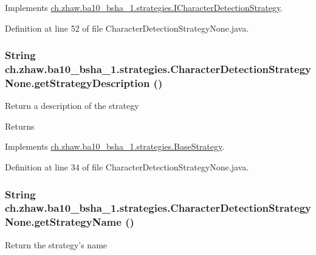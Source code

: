 Implements \hyperlink{interfacech_1_1zhaw_1_1ba10__bsha__1_1_1strategies_1_1ICharacterDetectionStrategy_a994429a274e75c471d18aca69dce2c1d}{ch.zhaw.ba10\_\-bsha\_\-1.strategies.ICharacterDetectionStrategy}.

Definition at line 52 of file CharacterDetectionStrategyNone.java.\hypertarget{classch_1_1zhaw_1_1ba10__bsha__1_1_1strategies_1_1CharacterDetectionStrategyNone_a77ffbdb8eb70ff5517bb8821a2c23572}{
\subsubsection[{getStrategyDescription}]{\setlength{\rightskip}{0pt plus 5cm}String ch.zhaw.ba10\_\-bsha\_\-1.strategies.CharacterDetectionStrategyNone.getStrategyDescription ()}}
\label{classch_1_1zhaw_1_1ba10__bsha__1_1_1strategies_1_1CharacterDetectionStrategyNone_a77ffbdb8eb70ff5517bb8821a2c23572}
Return a description of the strategy

\begin{DoxyReturn}{Returns}

\end{DoxyReturn}


Implements \hyperlink{classch_1_1zhaw_1_1ba10__bsha__1_1_1strategies_1_1BaseStrategy_a75fdb36932ad701f6375cc1fe718056b}{ch.zhaw.ba10\_\-bsha\_\-1.strategies.BaseStrategy}.

Definition at line 34 of file CharacterDetectionStrategyNone.java.\hypertarget{classch_1_1zhaw_1_1ba10__bsha__1_1_1strategies_1_1CharacterDetectionStrategyNone_a9ee9165c5f2511331b3defaa48d35b4c}{
\subsubsection[{getStrategyName}]{\setlength{\rightskip}{0pt plus 5cm}String ch.zhaw.ba10\_\-bsha\_\-1.strategies.CharacterDetectionStrategyNone.getStrategyName ()}}
\label{classch_1_1zhaw_1_1ba10__bsha__1_1_1strategies_1_1CharacterDetectionStrategyNone_a9ee9165c5f2511331b3defaa48d35b4c}
Return the strategy's name


